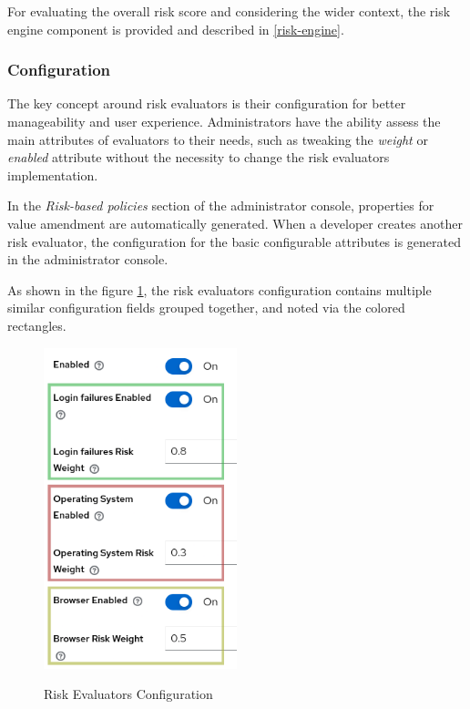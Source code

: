 For evaluating the overall risk score and considering the wider context, the risk engine component is provided and described in \ref{risk-engine}.

\subsubsection{Configuration}
The key concept around risk evaluators is their configuration for better manageability and user experience.
Administrators have the ability assess the main attributes of evaluators to their needs, such as tweaking the \textit{weight} or \textit{enabled} attribute without the necessity to change the risk evaluators implementation.

In the \textit{Risk-based policies} section of the administrator console, properties for value amendment are automatically generated.
When a developer creates another risk evaluator, the configuration for the basic configurable attributes is generated in the administrator console.

As shown in the figure \ref{fig:risk-based-evaluator-config}, the risk evaluators configuration contains multiple similar configuration fields grouped together, and noted via the colored rectangles. 

\begin{figure}[htbp]
  \centering
  \includegraphics[width=0.5\textwidth]{img/sections/5-design/risk-evaluators-config.png}
  \label{fig:risk-based-evaluator-config}
  \caption{Risk Evaluators Configuration}
\end{figure}

